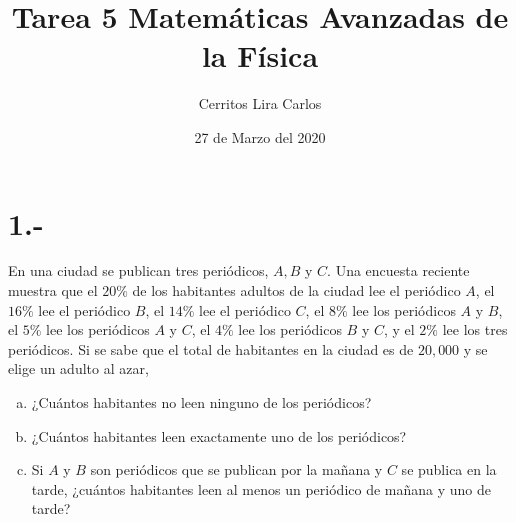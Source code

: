 \documentclass{article}
\title{Tarea 5 Matemáticas Avanzadas de la Física}
\author{Cerritos Lira Carlos}
\date{27 de Marzo del 2020}
\begin{document}
\maketitle
\section*{1.-}
En una ciudad se publican tres periódicos, $A,B$ y $C$. Una encuesta reciente muestra que el $20\%$ 
de los habitantes adultos de la ciudad lee el periódico $A$, el $16\%$ lee el periódico $B$, 
el $14\%$ lee el periódico $C$, el $8\%$ lee los periódicos $A$ y $B$, el $5\%$ lee los periódicos $A$ y $C$, 
el $4\%$ lee los periódicos $B$ y $C$, y el $2\%$ lee los tres periódicos. 
Si se sabe que el total de habitantes en la ciudad es de $20,000$ y se elige un adulto al azar,
\begin{enumerate}[a)]
    \item ¿Cuántos habitantes no leen ninguno de los periódicos?
    \item ¿Cuántos habitantes leen exactamente uno de los periódicos?
    \item Si $A$ y $B$ son periódicos que se publican por la mañana y $C$ se publica en la tarde, 
    ¿cuántos habitantes leen al menos un periódico de mañana y uno de tarde?
\end{enumerate}
\end{document}
